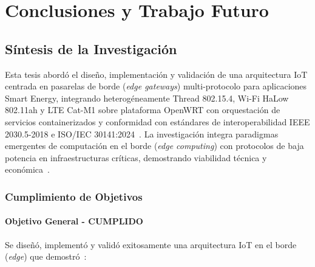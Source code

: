 ﻿\chapter{Conclusiones y Trabajo Futuro}


\section{Síntesis de la Investigación}

Esta tesis abordó el diseño, implementación y validación de una arquitectura IoT centrada en pasarelas de borde (\textit{edge gateways}) multi-protocolo para aplicaciones Smart Energy, integrando heterogéneamente Thread 802.15.4, Wi-Fi HaLow 802.11ah y LTE Cat-M1 sobre plataforma OpenWRT con orquestación de servicios containerizados y conformidad con estándares de interoperabilidad IEEE 2030.5-2018 e ISO/IEC 30141:2024~\cite{abdulsalamOverviewRecentWireless2024,tangResearchInteroperabilityIoT,liangReviewEdgeComputing2024,abowardahEdgeComputingIoT2024,ayaUnleashingIntelligenceEdge2024,cohenEdgeComputingEnabled2024,kumariEdgeComputingData2024,shenAugmentingEdgeIntelligence2024,wulurCoordinationEdgeCloud2024,zhangEnablingFaultTolerant2024}. La investigación integra paradigmas emergentes de computación en el borde (\textit{edge computing}) con protocolos de baja potencia en infraestructuras críticas, demostrando viabilidad técnica y económica~\cite{boonmeerukCostEffectiveIIoTGateway2024,perezImplicationSoftwareContainerization2024}.

\subsection{Cumplimiento de Objetivos}

\subsubsection{Objetivo General - CUMPLIDO}

Se diseñó, implementó y validó exitosamente una arquitectura IoT en el borde (\textit{edge}) que demostró~\cite{scharerPushingWiFiHaLow2025,saidiIoTGatewayPowered2024,zhouGatewayArchitectureSecurity}:

